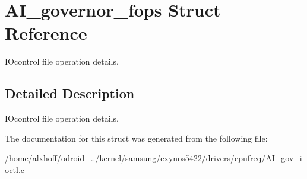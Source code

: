 \hypertarget{structAI__governor__fops}{}\section{A\+I\+\_\+governor\+\_\+fops Struct Reference}
\label{structAI__governor__fops}


I\+Ocontrol file operation details.  




\subsection{Detailed Description}
I\+Ocontrol file operation details. 

The documentation for this struct was generated from the following file\+:\begin{DoxyCompactItemize}
\item 
/home/alxhoff/odroid\+\_../kernel/samsung/exynos5422/drivers/cpufreq/\hyperlink{AI__gov__ioctl_8c}{A\+I\+\_\+gov\+\_\+ioctl.\+c}\end{DoxyCompactItemize}

